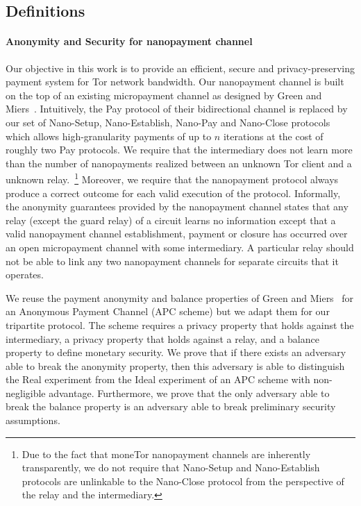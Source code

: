 
\subsection{Definitions}

\paragraph*{Anonymity and Security for nanopayment channel}
Our objective in this work is to provide an efficient, secure and
privacy-preserving payment system for Tor network bandwidth. Our nanopayment
channel is built on the top of an existing micropayment channel as designed by
Green and Miers~\cite{green2017bolt}. Intuitively, the Pay protocol of their
bidirectional channel is replaced by our set of Nano-Setup, Nano-Establish,
Nano-Pay and Nano-Close protocols which allows high-granularity payments of up
to $n$ iterations at the cost of roughly two Pay protocols.
We require that the intermediary does not learn more than the number of
nanopayments realized between an unknown Tor client and a unknown
relay.~\footnote{Due to the fact that moneTor nanopayment channels are
  inherently transparently, we do not require that Nano-Setup and Nano-Establish
  protocols are unlinkable to the Nano-Close protocol from the perspective of
  the relay and the intermediary.} Moreover, we require that the nanopayment
protocol always produce a correct outcome for each valid execution of the
protocol.  Informally, the anonymity guarantees provided by the nanopayment
channel states that any relay (except the guard relay) of a circuit learns no
information except that a valid nanopayment channel establishment, payment or
closure has occurred over an open micropayment channel with some intermediary. A
particular relay should not be able to link any two nanopayment channels for
separate circuits that it operates.

We reuse the payment anonymity and balance properties of Green and
Miers~\cite{bolt-eprint} for an Anonymous Payment Channel (APC scheme) but we
adapt them for our tripartite protocol. The scheme requires a privacy property
that holds against the intermediary, a privacy property that holds against a
relay, and a balance property to define monetary security.  We prove that if
there exists an adversary able to break the anonymity property, then this
adversary is able to distinguish the Real experiment from the Ideal experiment
of an APC scheme with non-negligible advantage. Furthermore, we prove that the
only adversary able to break the balance property is an adversary able to break
preliminary security assumptions.

